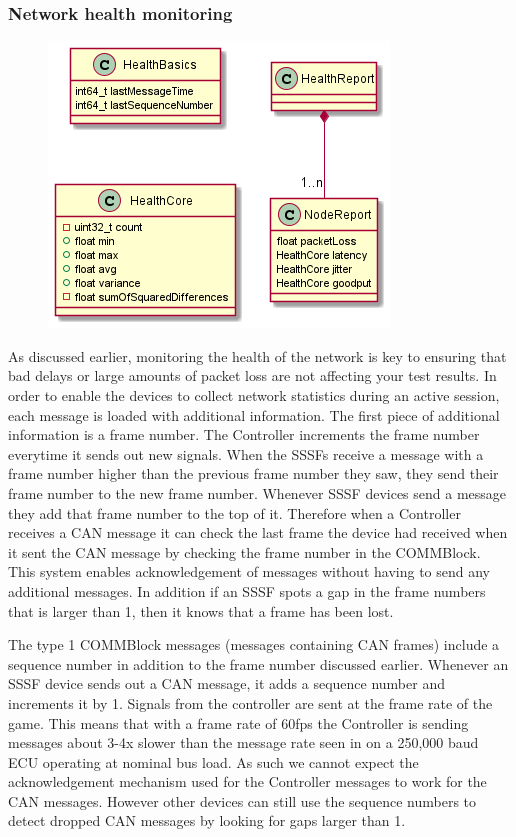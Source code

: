 \documentclass[letterpaper,twocolumn,12pt]{article}
\begin{document}
\subsubsection{Network health monitoring}
\begin{figure}[t!]
    \centering
    \includegraphics[width=\linewidth]{out/images/network_health/network_health.png}
    \caption{}
    \label{fig:}
\end{figure}
As discussed earlier, monitoring the health of the network is key to ensuring that bad delays or large amounts of packet loss are not affecting your test results. In order to enable the devices to collect network statistics during an active session, each message is loaded with additional information. The first piece of additional information is a frame number. The Controller increments the frame number everytime it sends out new signals. When the SSSFs receive a message with a frame number higher than the previous frame number they saw, they send their frame number to the new frame number. Whenever SSSF devices send a message they add that frame number to the top of it. Therefore when a Controller receives a CAN message it can check the last frame the device had received when it sent the CAN message by checking the frame number in the COMMBlock. This system enables acknowledgement of messages without having to send any additional messages. In addition if an SSSF spots a gap in the frame numbers that is larger than 1, then it knows that a frame has been lost.

The type 1 COMMBlock messages (messages containing CAN frames) include a sequence number in addition to the frame number discussed earlier. Whenever an SSSF device sends out a CAN message, it adds a sequence number and increments it by 1. Signals from the controller are sent at the frame rate of the game. This means that with a frame rate of 60fps the Controller is sending messages about 3-4x slower than the message rate seen in on a 250,000 baud ECU operating at nominal bus load. As such we cannot expect the acknowledgement mechanism used for the Controller messages to work for the CAN messages. However other devices can still use the sequence numbers to detect dropped CAN messages by looking for gaps larger than 1.
\end{document}
